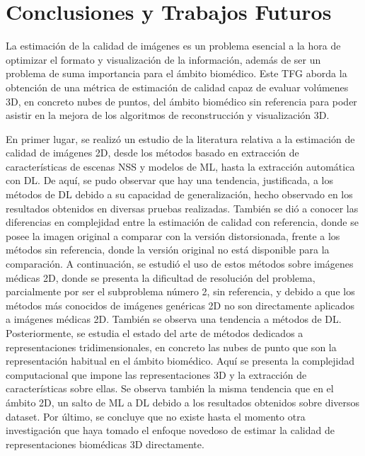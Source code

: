 \chapter{Conclusiones y Trabajos Futuros}
La estimación de la calidad de imágenes es un problema esencial a la hora 
de optimizar el formato y visualización de la información, además de ser 
un problema de suma importancia para el ámbito biomédico. Este TFG aborda 
la obtención de una métrica de estimación de calidad capaz de evaluar volúmenes 
3D, en concreto nubes de puntos, del ámbito biomédico sin referencia para poder asistir 
en la mejora de los algoritmos de reconstrucción y visualización 3D. 

En primer lugar, se realizó un estudio de la literatura relativa a la estimación 
de calidad de imágenes 2D, desde los métodos basado en extracción de características 
de escenas NSS y modelos de ML, hasta la extracción automática con DL. 
De aquí, se pudo observar que hay una tendencia, justificada, a los métodos de DL 
debido a su capacidad de generalización, hecho observado en los resultados obtenidos en diversas 
pruebas realizadas. También se dió a conocer las diferencias en complejidad entre la 
estimación de calidad con referencia, donde se posee la imagen original a comparar con 
la versión distorsionada, frente a los métodos sin referencia, donde la versión 
original no está disponible para la comparación.
A continuación, se estudió el uso de estos métodos sobre imágenes 
médicas 2D, donde se presenta la dificultad de resolución del problema, 
parcialmente por ser el subproblema número 2, sin referencia, y debido a que los 
métodos más conocidos de imágenes genéricas 2D no son directamente aplicados a imágenes 
médicas 2D. También se observa una tendencia a métodos de DL. Posteriormente, 
se estudia el estado del arte de métodos dedicados a representaciones tridimensionales, 
en concreto las nubes de punto que son la representación habitual en el ámbito biomédico. 
Aquí se presenta la complejidad computacional que impone las representaciones 3D y 
la extracción de características sobre ellas. Se observa también la misma tendencia 
que en el ámbito 2D, un salto de ML a DL debido a los resultados obtenidos 
sobre diversos dataset. Por último, se concluye que no existe hasta el momento 
otra investigación que haya tomado el enfoque novedoso de estimar la calidad de 
representaciones biomédicas 3D directamente. 


